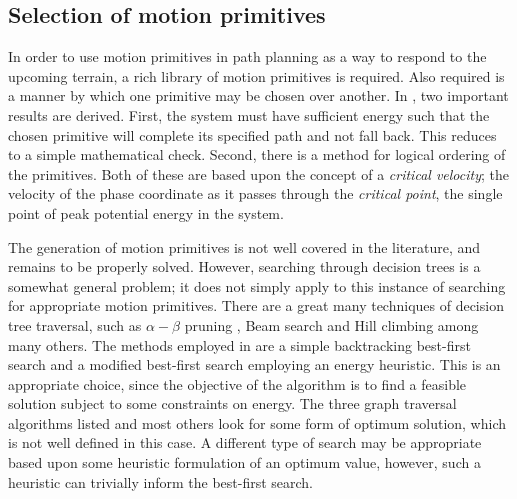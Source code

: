 \subsection{Selection of motion primitives}\label{sec:selection}
In order to use motion primitives in path planning as a way to respond to the upcoming terrain, a rich library of motion primitives is required. Also required is a manner by which one primitive may be chosen over another. In \cite{manchester13planning}, two important results are derived. First, the system must have sufficient energy such that the chosen primitive will complete its specified path and not fall back. This reduces to a simple mathematical check. Second, there is a method for logical ordering of the primitives. Both of these are based upon the concept of a \textit{critical velocity}; the velocity of the phase coordinate as it passes through the \textit{critical point}, the single point of peak potential energy in the system. 

The generation of motion primitives is not well covered in the literature, and remains to be properly solved. However, searching through decision trees is a somewhat general problem; it does not simply apply to this instance of searching for appropriate motion primitives. There are a great many techniques of decision tree traversal, such as $\alpha-\beta$ pruning \cite{knuth1976analysis}, Beam search \cite{steinbiss1994improvements} and Hill climbing \cite{goldfeld1966maximization} among many others. The methods employed in \cite{manchester13planning} are a simple backtracking best-first search and a modified best-first search employing an energy heuristic. This is an appropriate choice, since the objective of the algorithm is to find a feasible solution subject to some constraints on energy. The three graph traversal algorithms listed and most others look for some form of optimum solution, which is not well defined in this case. A different type of search may be appropriate based upon some heuristic formulation of an optimum value, however, such a heuristic can trivially inform the best-first search.